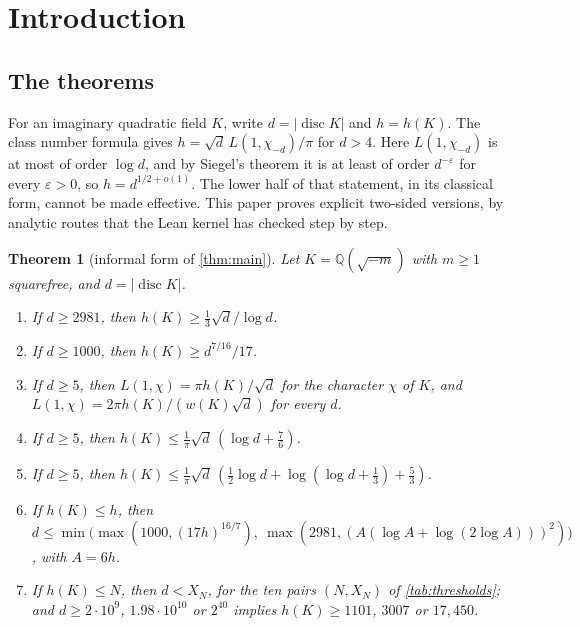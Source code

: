 \documentclass[11pt]{article}
\newtheorem{theorem}{Theorem}[section]
\theoremstyle{definition}
\newcommand{\Q}{\mathbb{Q}}
\newcommand{\disc}{\operatorname{disc}}
\begin{document}
\section{Introduction}

\subsection{The theorems}

For an imaginary quadratic field $K$, write $d = |\disc K|$ and $h = h(K)$. The class number formula gives $h = \sqrt d\,L(1,\chi_{-d})/\pi$ for $d > 4$. Here $L(1,\chi_{-d})$ is at most of order $\log d$, and by Siegel's theorem it is at least of order $d^{-\varepsilon}$ for every $\varepsilon > 0$, so $h = d^{1/2+o(1)}$. The lower half of that statement, in its classical form, cannot be made effective. This paper proves explicit two-sided versions, by analytic routes that the Lean kernel has checked step by step.

\begin{theorem}[informal form of \cref{thm:main}]\label{thm:informal}
Let $K = \Q(\sqrt{-m})$ with $m \ge 1$ squarefree, and $d = |\disc K|$.
\begin{enumerate}[nosep]
\item[\textup{(L$'$)}] If $d \ge 2981$, then $h(K) \ge \frac13\sqrt d/\log d$.
\item[\textup{(P$'$)}] If $d \ge 1000$, then $h(K) \ge d^{7/16}/17$.
\item[\textup{(CNF)}] If $d \ge 5$, then $L(1,\chi) = \pi h(K)/\sqrt d$ for the character $\chi$ of $K$, and $L(1,\chi) = 2\pi h(K)/(w(K)\sqrt d)$ for every $d$.
\item[\textup{(U$'$)}] If $d \ge 5$, then $h(K) \le \frac1\pi\sqrt d\,(\log d + \frac76)$.
\item[\textup{(U$''$)}] If $d \ge 5$, then $h(K) \le \frac1\pi\sqrt d\,(\frac12\log d + \log(\log d + \frac13) + \frac53)$.
\item[\textup{(B$^*$)}] If $h(K) \le h$, then $d \le \min\bigl(\max(1000, (17h)^{16/7}),\ \max(2981, (A(\log A + \log(2\log A)))^2)\bigr)$, with $A = 6h$.
\item[\textup{(T)}] If $h(K) \le N$, then $d < X_N$, for the ten pairs $(N, X_N)$ of \cref{tab:thresholds}; and $d \ge 2\cdot10^9$, $1.98\cdot10^{10}$ or $2^{40}$ implies $h(K) \ge 1101$, $3007$ or $17{,}450$.
\end{enumerate}
\end{theorem}
\end{document}
